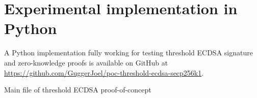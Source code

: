\chapter{Experimental implementation in Python}
\label{chap:pyImpl}

A Python implementation fully working for testing threshold ECDSA signature and zero-knowledge proofs
is available on GitHub at \url{https://github.com/GuggerJoel/poc-threshold-ecdsa-secp256k1}.

\begin{longlisting}
	\caption{Main file of threshold ECDSA proof-of-concept}
	\label{lst:secdsaPythonPoc}
\end{longlisting}
